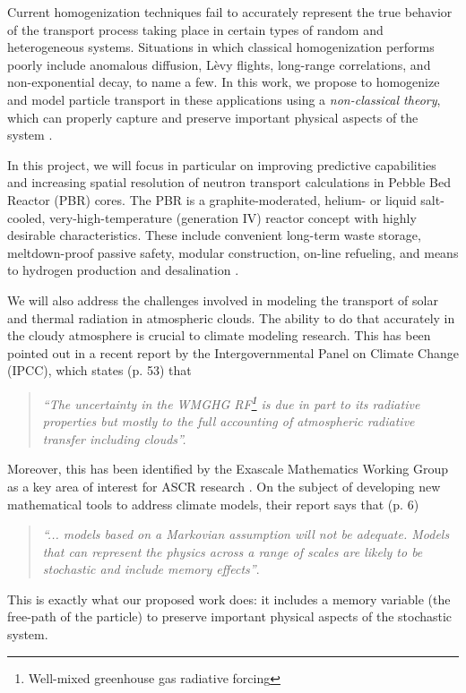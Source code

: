 \documentclass[12pt]{article}
\begin{document}
Current homogenization techniques fail to accurately represent the true behavior of the transport process taking place in certain types of random and heterogeneous systems.
Situations in which classical homogenization performs poorly include anomalous diffusion, L\`evy flights, long-range correlations, and non-exponential decay, to name a few.
In this work, we propose to homogenize and model particle transport in these applications using a \textit{non-classical theory}, which can properly capture and preserve important physical aspects of the system \cite{larvas11,davxu14,xudav16,vaslar14b,vas13}.

In this project, we will focus in particular on improving predictive capabilities and increasing spatial resolution of neutron transport calculations in Pebble Bed Reactor (PBR) cores.
The PBR is a graphite-moderated, helium- or liquid salt-cooled, very-high-temperature (generation IV) reactor concept with highly desirable characteristics.
These include convenient long-term waste storage, meltdown-proof passive safety, modular construction, on-line refueling, and means to hydrogen production and desalination \cite{htrpm,pbmr,mpbr}.

We will also address the challenges involved in modeling the transport of solar and thermal radiation in atmospheric clouds.
The ability to do that accurately in the cloudy atmosphere is crucial to climate modeling research.
This has been pointed out in a recent report\cite{ipcc13} by the Intergovernmental Panel on Climate Change (IPCC), which states (p. 53) that
\begin{quote}
\textit{``The uncertainty in the WMGHG RF\footnote{Well-mixed greenhouse gas radiative forcing} is due in part to its radiative properties but mostly to the full accounting of atmospheric radiative transfer including clouds''.}
\end{quote}

Moreover, this has been identified by the Exascale Mathematics Working Group as a key area of interest for ASCR research \cite{amrec14}.
On the subject of developing new mathematical tools to address climate models, their report says that (p. 6)
\begin{quote}
\textit{``... models based on a Markovian assumption will not be adequate.
Models that can represent the physics across a range of scales are likely to be stochastic and include memory effects''}.
\end{quote}
This is exactly what our proposed work does: it includes a memory variable (the free-path of the particle) to preserve important physical aspects of the stochastic system.
\end{document}
